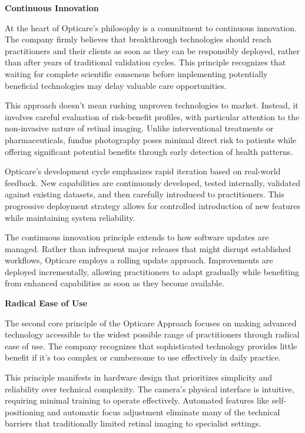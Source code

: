 \documentclass[
  Letterpaper,
]{scrbook}
\begin{document}
\textbf{Continuous Innovation}

At the heart of Opticare's philosophy is a commitment to continuous
innovation. The company firmly believes that breakthrough technologies
should reach practitioners and their clients as soon as they can be
responsibly deployed, rather than after years of traditional validation
cycles. This principle recognizes that waiting for complete scientific
consensus before implementing potentially beneficial technologies may
delay valuable care opportunities.

This approach doesn't mean rushing unproven technologies to market.
Instead, it involves careful evaluation of risk-benefit profiles, with
particular attention to the non-invasive nature of retinal imaging.
Unlike interventional treatments or pharmaceuticals, fundus photography
poses minimal direct risk to patients while offering significant
potential benefits through early detection of health patterns.

Opticare's development cycle emphasizes rapid iteration based on
real-world feedback. New capabilities are continuously developed, tested
internally, validated against existing datasets, and then carefully
introduced to practitioners. This progressive deployment strategy allows
for controlled introduction of new features while maintaining system
reliability.

The continuous innovation principle extends to how software updates are
managed. Rather than infrequent major releases that might disrupt
established workflows, Opticare employs a rolling update approach.
Improvements are deployed incrementally, allowing practitioners to adapt
gradually while benefiting from enhanced capabilities as soon as they
become available.

\textbf{Radical Ease of Use}

The second core principle of the Opticare Approach focuses on making
advanced technology accessible to the widest possible range of
practitioners through radical ease of use. The company recognizes that
sophisticated technology provides little benefit if it's too complex or
cumbersome to use effectively in daily practice.

This principle manifests in hardware design that prioritizes simplicity
and reliability over technical complexity. The camera's physical
interface is intuitive, requiring minimal training to operate
effectively. Automated features like self-positioning and automatic
focus adjustment eliminate many of the technical barriers that
traditionally limited retinal imaging to specialist settings.
\end{document}
